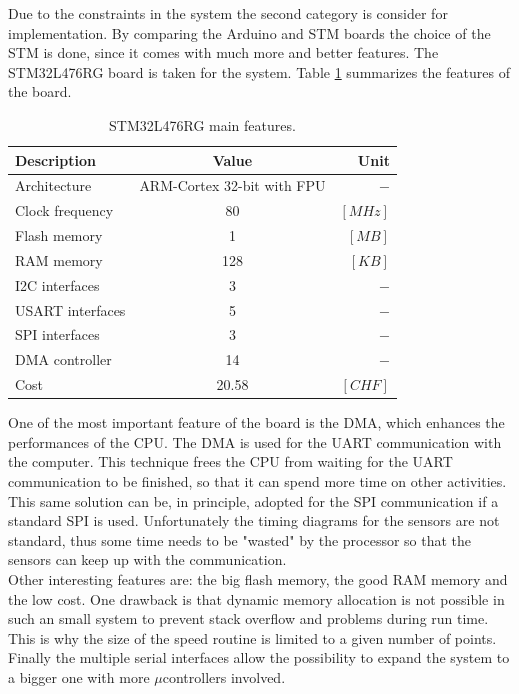 \documentclass[12pt,a4paper, twoside]{article}
\begin{document}
Due to the constraints in the system the second category is consider for implementation. By comparing the Arduino and STM boards the choice of the STM is done, since it comes with much more and better features. The  STM32L476RG board is taken for the system. Table \ref{tab:board} summarizes the features of the board.
\begin{table}[H]
	\centering
	\begin{tabular}{l||c|r} 
		\textbf{Description}&\textbf{Value}  &\textbf{Unit}  \\ 
		\hline
		\hline 
		Architecture & ARM-Cortex 32-bit with FPU & $-$ \\ 
		\hline 
		Clock frequency & 80  & $[MHz]$  \\ 
		\hline 
		Flash memory & 1 & $[MB]$ \\ 
		\hline 
		RAM memory & 128 & $[KB]$  \\ 
		\hline 
		I2C interfaces & 3 & $-$  \\ 
		\hline 
		USART interfaces & 5  & $-$  \\ 
		\hline 
		SPI interfaces & 3  & $-$  \\  
		\hline 
		DMA controller & 14 & $-$  \\
		\hline
		Cost & 20.58 &$[CHF]$
	\end{tabular} 
	\caption{STM32L476RG main features.}
	\label{tab:board}
\end{table}
One of the most important feature of the board is the DMA, which enhances the performances of the CPU. The DMA is used for the UART communication with the computer. This technique frees the CPU from waiting for the UART communication to be finished, so that it can spend more time on other activities. This same solution can be, in principle, adopted for the SPI communication if a standard SPI is used. Unfortunately the timing diagrams for the sensors are not standard, thus some time needs to be "wasted" by the processor so that the sensors can keep up with the communication.\\

Other interesting features are: the big flash memory, the good RAM memory and the low cost. One drawback is that dynamic memory allocation is not possible in such an small system to prevent stack overflow and problems during run time. This is why the size of the speed routine is limited to a given number of points.
Finally the multiple serial interfaces allow the possibility to expand the system to a bigger one with more $\mu$controllers involved.
\end{document}
